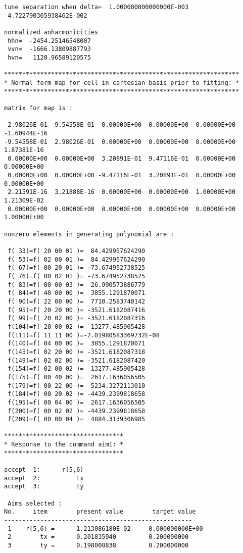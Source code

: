 \begin{footnotesize}
\begin{verbatim}
tune separation when delta=  1.000000000000000E-003
 4.722790365938462E-002

normalized anharmonicities
 hhn=  -2454.25146548007
 vvn=  -1666.13809887793
 hvn=   1120.96589120575

*****************************************************************
* Normal form map for cell in cartesian basis prior to fitting: *
*****************************************************************

matrix for map is :

 2.98026E-01  9.54558E-01  0.00000E+00  0.00000E+00  0.00000E+00 -1.60944E-16
-9.54558E-01  2.98026E-01  0.00000E+00  0.00000E+00  0.00000E+00  1.87381E-16
 0.00000E+00  0.00000E+00  3.20891E-01  9.47116E-01  0.00000E+00  0.00000E+00
 0.00000E+00  0.00000E+00 -9.47116E-01  3.20891E-01  0.00000E+00  0.00000E+00
 2.21591E-16  3.21888E-16  0.00000E+00  0.00000E+00  1.00000E+00  1.21309E-02
 0.00000E+00  0.00000E+00  0.00000E+00  0.00000E+00  0.00000E+00  1.00000E+00

nonzero elements in generating polynomial are :

 f( 33)=f( 20 00 01 )=  84.429957624290
 f( 53)=f( 02 00 01 )=  84.429957624290
 f( 67)=f( 00 20 01 )= -73.674952738525
 f( 76)=f( 00 02 01 )= -73.674952738525
 f( 83)=f( 00 00 03 )=  26.990573886779
 f( 84)=f( 40 00 00 )=  3855.1291870071
 f( 90)=f( 22 00 00 )=  7710.2583740142
 f( 95)=f( 20 20 00 )= -3521.6182087416
 f( 99)=f( 20 02 00 )= -3521.6182087316
 f(104)=f( 20 00 02 )=  13277.485905428
 f(111)=f( 11 11 00 )=-2.01980583369732E-08
 f(140)=f( 04 00 00 )=  3855.1291870071
 f(145)=f( 02 20 00 )= -3521.6182087318
 f(149)=f( 02 02 00 )= -3521.6182087420
 f(154)=f( 02 00 02 )=  13277.485905428
 f(175)=f( 00 40 00 )=  2617.1636056505
 f(179)=f( 00 22 00 )=  5234.3272113010
 f(184)=f( 00 20 02 )= -4439.2399818658
 f(195)=f( 00 04 00 )=  2617.1636056505
 f(200)=f( 00 02 02 )= -4439.2399818658
 f(209)=f( 00 00 04 )=  4884.3139306985

*********************************
* Response to the command aim1: *
*********************************

accept  1:      r(5,6)
accept  2:          tx
accept  3:          ty

 Aims selected :
No.     item        present value        target value
----------------------------------------------------
 1    r(5,6) =      1.213086180E-02     0.000000000E+00
 2        tx =      0.201835940         0.200000000
 3        ty =      0.198008838         0.200000000


\end{verbatim}
\end{footnotesize}
